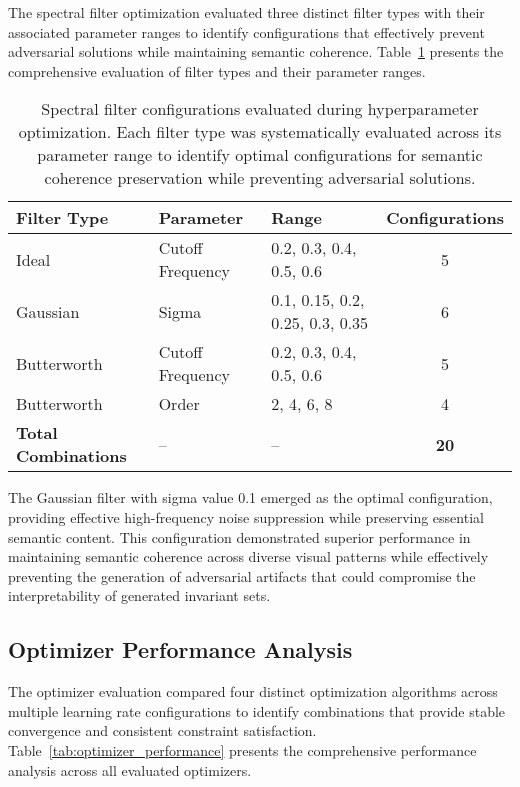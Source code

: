 The spectral filter optimization evaluated three distinct filter types with their associated parameter ranges to identify configurations that effectively prevent adversarial solutions while maintaining semantic coherence. Table~\ref{tab:filter_configs} presents the comprehensive evaluation of filter types and their parameter ranges.

\begin{table}[h!]
\centering
\begin{tabular}{lllc}
\toprule
\textbf{Filter Type} & \textbf{Parameter} & \textbf{Range} & \textbf{Configurations} \\
\midrule
Ideal & Cutoff Frequency & 0.2, 0.3, 0.4, 0.5, 0.6 & 5 \\
Gaussian & Sigma & 0.1, 0.15, 0.2, 0.25, 0.3, 0.35 & 6 \\
Butterworth & Cutoff Frequency & 0.2, 0.3, 0.4, 0.5, 0.6 & 5 \\
Butterworth & Order & 2, 4, 6, 8 & 4 \\
\midrule
\textbf{Total Combinations} & -- & -- & \textbf{20} \\
\bottomrule
\end{tabular}
\caption{Spectral filter configurations evaluated during hyperparameter optimization. Each filter type was systematically evaluated across its parameter range to identify optimal configurations for semantic coherence preservation while preventing adversarial solutions.}
\label{tab:filter_configs}
\end{table}

The Gaussian filter with sigma value 0.1 emerged as the optimal configuration, providing effective high-frequency noise suppression while preserving essential semantic content. This configuration demonstrated superior performance in maintaining semantic coherence across diverse visual patterns while effectively preventing the generation of adversarial artifacts that could compromise the interpretability of generated invariant sets.

\subsection{Optimizer Performance Analysis}

The optimizer evaluation compared four distinct optimization algorithms across multiple learning rate configurations to identify combinations that provide stable convergence and consistent constraint satisfaction. Table~\ref{tab:optimizer_performance} presents the comprehensive performance analysis across all evaluated optimizers.


